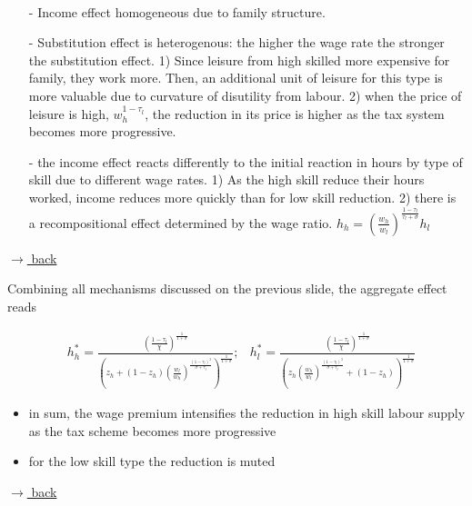 \documentclass[11pt,aspectratio=169]{beamer}
\begin{document}
\begin{frame}{\ \ }
	\begin{enumerate}
		\item[-]  Income effect homogeneous due to family structure. 
		\item[-] Substitution effect  is heterogenous: the higher the wage rate the stronger the substitution effect.  1) Since leisure from high skilled more expensive for family, they work more. Then, an additional unit of leisure for this type is more valuable due to curvature of disutility from labour. 2) when the price of leisure is high, $w_h^{1-\tau_l}$, the reduction in its price is higher as the tax system becomes more progressive. 
		\item[-] the income effect reacts differently to the initial reaction in hours by type of skill due to different wage rates. 1) As the high skill reduce their hours worked, income reduces more quickly than for low skill reduction. 2) there is a recompositional effect determined by the wage ratio. $h_h=\left(\frac{w_h}{w_l}\right)^{\frac{1-\tau_l}{\tau_l+\sigma}}h_l$
	\end{enumerate}
 \vspace{0mm}
\hfill
\hyperlink{backhh}{\tiny{$\rightarrow$ back}}
\end{frame}
\begin{frame}
Combining all mechanisms discussed on the previous slide, the aggregate effect reads

\begin{align*}
& h_h^*=\frac{\left(\frac{1-\tau_l}{\chi}\right)^{\frac{1}{1+\sigma}}}{\left(z_h+(1-z_h)\left(\frac{w_l}{w_h}\right)^{\frac{(1-\tau_l)^3}{\sigma+\tau_l}}\right)^{\frac{1}{1+\sigma}}};& h_l^*=\frac{\left(\frac{1-\tau_l}{\chi}\right)^{\frac{1}{1+\sigma}}}{ \left(z_h\left(\frac{w_h}{w_l}\right)^{\frac{(1-\tau_l)^3}{\sigma+\tau_l}}+(1-z_h)\right)^{\frac{1}{1+\sigma}}}
\end{align*}
\begin{itemize}
	\item in sum, the wage premium intensifies the reduction in high skill labour supply as the tax scheme becomes more progressive
	\item for the low skill type the reduction is muted
\end{itemize}
\vspace{-8mm}
\hfill
\hyperlink{backhh}{\tiny{$\rightarrow$ back}}
\end{frame}
\end{document}
